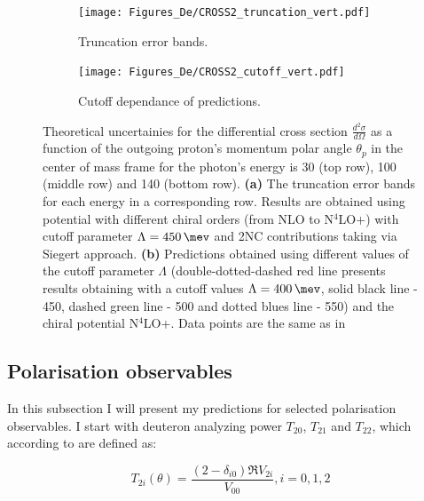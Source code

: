         
    \begin{figure}[h]
        \centering
        \begin{subfigure}[t]{0.46\textwidth}
            \texttt{[image: Figures\_De/CROSS2\_truncation\_vert.pdf]}
            \caption{ Truncation error bands.}
            \label{Diff_cross_truncation}
        \end{subfigure}
        \begin{subfigure}[t]{0.46\textwidth}
            \texttt{[image: Figures\_De/CROSS2\_cutoff\_vert.pdf]}
            \caption{Cutoff dependance  of predictions.}
            \label{Diff_cross_cutoff}
        \end{subfigure}
        \caption{Theoretical uncertainies 
        for the differential cross section $\frac{d^2\sigma}{d\Omega}$
        as a function of the outgoing proton's momentum polar angle $\theta_p$ in the center of mass frame 
        for the photon's energy is \SI{30}{\mev} (top row), \SI{100}{\mev} (middle row) and \SI{140}{\mev} (bottom row).
        {\bf(a)} The truncation error bands for each energy in a corresponding row. 
        Results are obtained using potential with different chiral orders (from NLO to N$^4$LO+) 
        with cutoff parameter $\Lambda=\SI{450}{\mev}$ and 2NC contributions taking via Siegert approach.
        {\bf (b)} Predictions obtained using different values of the cutoff parameter $\Lambda$
        (double-dotted-dashed red line presents results obtaining with 
        a cutoff values $\Lambda=\SI{400}{\mev}$, solid black line - \SI{450}{\mev}, dashed green line - \SI{500}{\mev}
        and dotted blues line - \SI{550}{\mev}) and the chiral potential N$^4$LO+. 
        Data points are the same as in }
        \label{Diff_cross_err}
    \end{figure}

    \clearpage

    \subsection{Polarisation observables}
    \label{tensor_results}

    In this subsection I will present my predictions for 
    selected polarisation observables.
    I start with deuteron analyzing power $T_{20}$, $T_{21}$ and $T_{22}$,
    which according to \cite{ArenhovelPhotodisint1991} are defined as:
    
    \begin{equation}
        T_{2i} (\theta) = \frac{(2 - \delta_{i0}) \Re V_{2i}}{V_{00}}, i=0,1,2
    \end{equation}

